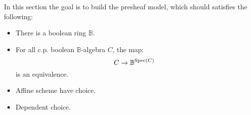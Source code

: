 In this section the goal is to build the presheaf model, which should satisfies the following:

\begin{itemize}
\item There is a boolean ring $\mathbb{B}$.
\item For all c.p. boolean $\mathbb{B}$-algebra $C$, the map:
\[C \to \mathbb{B}^{\operatorname{Spec}(C)}\]
is an equivalence.
\item Affine scheme have choice.
\item Dependent choice.
\end{itemize}